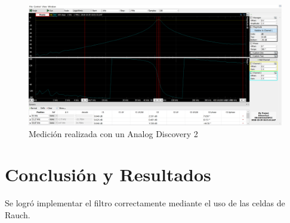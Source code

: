 \documentclass[../../tc_tp5_main.tex]{subfiles}
\begin{document}
	\begin{figure}[H]	%
	\centering
	\includegraphics[scale=0.5]{imagenes/defaultc.png}
	\caption{Medición realizada con un Analog Discovery 2}
	\label{fig:ej2_defaultc}
	\end{figure}
	

 	 
\section{Conclusión y Resultados}

Se logró implementar el filtro correctamente mediante el uso de las celdas de Rauch. 
\clearpage\newpage
\end{document}
